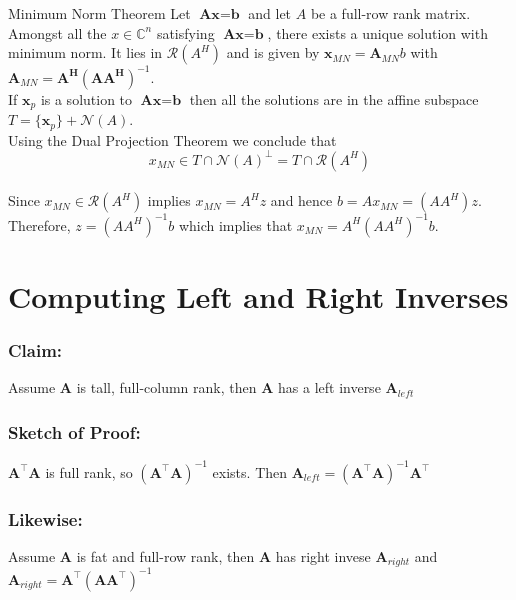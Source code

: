 \begin{theorembox}{Minimum Norm Theorem}
Let \( \textbf{Ax} = \textbf{b} \) and let \( A \) be a full-row rank matrix.\\
Amongst all the \( x \in \mathbb{C}^n \) satisfying \( \textbf{Ax} = \textbf{b} \), there exists a unique solution with minimum norm. It lies in \( \mathcal{R}(A^H) \) and is given by \( \textbf{x}_{MN} = \textbf{A}_{MN}b \) with \( \textbf{A}_{MN} = \textbf{A}^\textbf{H}(\textbf{AA}^\textbf{H})^{-1} \).\\

If \( \textbf{x}_p \) is a solution to \( \textbf{Ax} = \textbf{b} \) then all the solutions are in the affine subspace \( T = \{\textbf{x}_p\} + \mathcal{N}(A) \). \\

Using the Dual Projection Theorem we conclude that \[ x_{MN} \in T \cap \mathcal{N}(A)^{\perp} = T \cap \mathcal{R}(A^H) \] \\

Since \( x_{MN} \in \mathcal{R}(A^H) \) implies \( x_{MN} = A^Hz \) and hence \( b = Ax_{MN} = (AA^H)z \).\\

Therefore, \( z = (AA^H)^{-1}b \) which implies that \( x_{MN} = A^H(AA^H)^{-1}b \).
\end{theorembox}

\section{Computing Left and Right Inverses}
\subsubsection*{Claim:}
Assume $\textbf{A}$ is tall, full-column rank, then $\textbf{A}$ has a left inverse $\textbf{A}_{left}$

\subsubsection*{Sketch of Proof:}
$\textbf{A}^\top \textbf{A}$ is full rank, so $(\textbf{A}^\top \textbf{A})^{-1}$ exists. Then $\textbf{A}_{left} = (\textbf{A}^\top \textbf{A})^{-1} \textbf{A}^\top$ 

\subsubsection*{Likewise:}
Assume $\textbf{A}$ is fat and full-row rank, then \textbf{A} has right invese $\textbf{A}_{right}$ and $\textbf{A}_{right} = \textbf{A}^\top (\textbf{AA}^\top)^{-1}$

